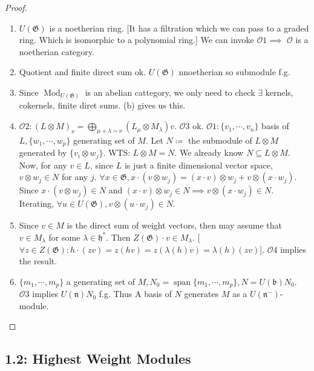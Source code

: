 \documentclass{article}
\theoremstyle{definition}
\begin{document}
    \begin{proof}
        \begin{enumerate}[label=\alph*)]
            \item \(U(\mathfrak{G})\) is a noetherian ring. [It has a filtration which we can pass to a graded ring. Which is isomorphic to a polynomial ring.] We can invoke \(\mathcal{O}1 \implies\) \(\mathcal{O}\) is a noetherian category.
            \item Quotient and finite direct sum ok. \(U(\mathfrak{G})\) nnoetherian so submodule f.g.
            \item Since \(\operatorname{Mod}_{U(\mathfrak{G})}\) is an abelian cattegory, we only need to check \(\exists\) kernels, cokernels, finite diret sums. (b) gives us this.
            \item \(\mathcal{O}2: (L \otimes M)_\nu = \bigoplus_{\mu +\lambda =\nu} (L_\mu \otimes M_\lambda) v\). \(\mathcal{O}3\) ok. \(\mathcal{O}1: \{ v_1, \cdots , v_n \}\) basis of \(L, \{ w_1, \cdots , w_p \}\) generating set of \(M\). Let \(N \coloneqq\) the submodule of \(L \otimes M\) generated by \(\{ v_i \otimes w_j \}\). WTS: \(L \otimes M = N\). We already know \(N \subseteq L \otimes M\). Now, for any \(v\in L\), since \(L\) is just a finite dimensional vector space, \(v \otimes w_j \in N\) for any \(j\). \(\forall x\in \mathfrak{G}, x \cdot (v \otimes w_j) = (x \cdot v) \otimes w_j + v \otimes (x \cdot w_j)\). Since \(x \cdot (v \otimes w_j) \in N\) and \((x \cdot v) \otimes w_j \in N \implies v \otimes (x \cdot w_j) \in N\). Iterating, \(\forall u\in U(\mathfrak{G}), v \otimes (u \cdot w_j) \in N\).
            \item Since \(v\in M\) is the direct sum of weight vectors, then may assume that \(v\in M_\lambda\) for some \(\lambda \in \mathfrak{h}^{\ast}\). Then \(Z(\mathfrak{G}) \cdot v \in M_\lambda\). [\(\forall z\in Z(\mathfrak{G}): h \cdot (zv) = z(hv) = z(\lambda(h)v) = \lambda(h)(zv)\)]. \(\mathcal{O}4\) implies the result.
            \item \(\{ m_1, \cdots , m_p \}\) a generating set of \(M, N_0 = \operatorname{span}\{ m_1, \cdots , m_p \}, N = U(\mathfrak{b}) N_0.\) \(\mathcal{O}3\) implies \(U(\mathfrak{n})N_0\) f.g. Thus A basis of \(N\) generates \(M\) as a \(U(\mathfrak{n}^-)\)-module.
        \end{enumerate} 
    \end{proof}

    \subsection*{1.2: Highest Weight Modules}
\end{document}
